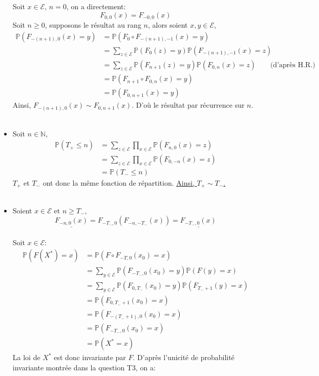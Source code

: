 \documentclass[a4paper,11pt]{article}
\def \P{\mathbb{P}}
\def \E{\mathcal{E}}
\begin{document}
\begin{itemize}
Soit $x \in \E$, $n=0$, on a directement:
\[F_{0,0}(x)=F_{-0,0}(x)\]
Soit $n \geq 0$, supposons le résultat au rang $n$, alors soient $x,y \in \E$,
\begin{equation*}
\begin{split}
\P(F_{-(n+1),0}(x)=y)&=\P(F_0\circ F_{-(n+1),-1}(x)=y)\\
&=\sum_{z \in \E} \P(F_0(z)=y)\P(F_{-(n+1),-1}(x)=z)\\
&=\sum_{z \in \E} \P(F_{n+1}(z)=y)\P(F_{0,n}(x)=z) \quad\quad\text{(d'après H.R.)}\\
&=\P(F_{n+1}\circ F_{0,n}(x)=y)\\
&=\P(F_{0,n+1}(x)=y)
\end{split}
\end{equation*}
Ainsi, $F_{-(n+1),0}(x) \sim F_{0,n+1}(x)$.
D'où le résultat par récurrence sur $n$.\\
\\
\item[\textbullet]
Soit $n \in \mathbb{N}$,
\begin{equation*}
\begin{split}
\P(T_{+}\leq n)&=\sum_{z \in \E} \prod_{x \in \E} \P(F_{n,0}(x)=z)\\
&=\sum_{z \in \E} \prod_{x \in \E} \P(F_{0,-n}(x)=z)\\
&=\P(T_{-}\leq n)
\end{split}
\end{equation*}
$T_+$ et $T_-$ ont donc la même fonction de répartition.
\underline{Ainsi, $T_+ \sim T_-$.}\\
\\
\item[\textbullet]
Soient $x \in \E$ et $n \geq T_-$,
\[\underline{F_{-n,0}(x)}=F_{-T_-,0}(F_{-n,-T_-}(x))=\underline{F_{-T_-,0}(x)}\]\\
Soit $x \in \E$:
\begin{equation*}
\begin{split}
\P(F(X^*) = x) &= \P(F\circ F_{-T,0}(x_0) = x) \\
	      &= \sum_{y \in \E}\P(F_{-T_-,0}(x_0)=y)\P(F(y)=x)\\
	      &= \sum_{y \in \E}\P(F_{0,T_-}(x_0)=y)\P(F_{T_-+1}(y)=x)\\
	      &= \P(F_{0,T_-+1}(x_0)=x)\\
	      &= \P(F_{-(T_-+1),0}(x_0)=x)\\
	      &= \P(F_{-T_-,0}(x_0)=x)\\
	      &= \P(X^*=x)
\end{split}
\end{equation*}
La loi de $X^*$ est donc invariante par $F$. D'après l'unicité de probabilité invariante montrée dans la question T3, on a:

\begin{center}
\end{center}

\end{itemize}
\end{document}
